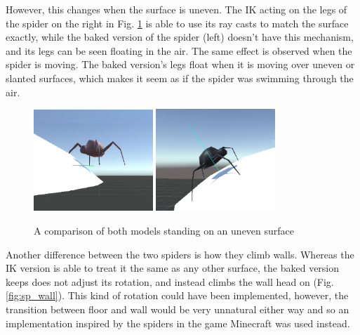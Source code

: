 However, this changes when the surface is uneven. The IK acting on
the legs of the spider on the right in Fig. \ref{fig:sp_round} is able to use
its ray casts to match the surface exactly, while the baked version of the
spider (left) doesn't have this mechanism, and its legs can be seen floating in
the air. The same effect is observed when the spider is moving. The baked
version's legs float when it is moving over uneven or slanted surfaces, which
makes it seem as if the spider was swimming through the air. 

\begin{figure}[h!]
    \centering
    \captionsetup{justification=centering}
    \includegraphics[width=0.4\textwidth]{grafika/sp_b_round.eps}
    \includegraphics[width=0.4\textwidth]{grafika/sp_ik_round.eps}
    \caption{A comparison of both models standing on an uneven surface}
    \label{fig:sp_round}
\end{figure}

Another difference between the two spiders is how they climb walls. Whereas the
IK version is able to treat it the same as any other surface, the baked version
keeps does not adjust its rotation, and instead climbs the wall head on (Fig.
\ref{fig:sp_wall}). This kind of rotation could have been implemented, however,
the transition between floor and wall would be very unnatural either way and so
an implementation inspired by the spiders in the game Minecraft was used
instead.

